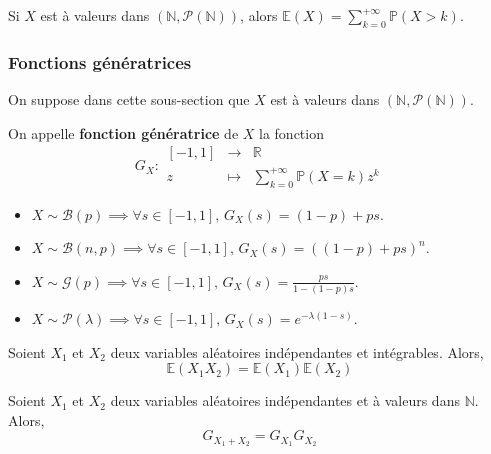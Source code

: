 
  \begin{proposition}
    Si $X$ est à valeurs dans $(\mathbb{N}, \mathcal{P}(\mathbb{N}))$, alors $\mathbb{E}(X) = \sum_{k=0}^{+\infty} \mathbb{P}(X > k)$.
  \end{proposition}

  \subsubsection{Fonctions génératrices}

  On suppose dans cette sous-section que $X$ est à valeurs dans $(\mathbb{N}, \mathcal{P}(\mathbb{N}))$.


  \begin{definition}
    On appelle \textbf{fonction génératrice} de $X$ la fonction
    \[
      G_X :
      \begin{array}{ccc}
        [-1,1] &\rightarrow& \mathbb{R} \\
        z &\mapsto& \sum_{k=0}^{+\infty} \mathbb{P}(X=k) z^k
      \end{array}
    \]
  \end{definition}

  \begin{example}
    \begin{itemize}
      \item $X \sim \mathcal{B}(p) \implies \forall s \in [-1,1], \, G_X(s) = (1-p) + ps$.
      \item $X \sim \mathcal{B}(n, p) \implies \forall s \in [-1,1], \, G_X(s) = ((1-p) + ps)^n$.
      \item $X \sim \mathcal{G}(p) \implies \forall s \in [-1,1], \, G_X(s) = \frac{ps}{1-(1-p)s}$.
      \item $X \sim \mathcal{P}(\lambda) \implies \forall s \in [-1,1], \, G_X(s) = e^{-\lambda (1-s)}$.
    \end{itemize}
  \end{example}

  \begin{theorem}
    Soient $X_1$ et $X_2$ deux variables aléatoires indépendantes et intégrables. Alors,
    \[ \mathbb{E}(X_1 X_2) = \mathbb{E}(X_1) \mathbb{E}(X_2) \]
  \end{theorem}

  \begin{corollary}
    Soient $X_1$ et $X_2$ deux variables aléatoires indépendantes et à valeurs dans $\mathbb{N}$. Alors,
    \[ G_{X_1+X_2} = G_{X_1} G_{X_2} \]
  \end{corollary}

